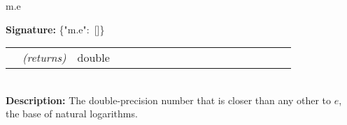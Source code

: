 {{    {m.e}{\hypertarget{m.e}{\noindent \mbox{\hspace{0.015\linewidth}} {\bf Signature:} \mbox{\PFAc \{"m.e":$\!$ []\}  \vspace{0.2 cm} \\} \vspace{0.2 cm} \\ \rm \begin{tabular}{p{0.01\linewidth} l p{0.8\linewidth}} & {\it (returns)} & double \\ \end{tabular} \vspace{0.3 cm} \\ \mbox{\hspace{0.015\linewidth}} {\bf Description:} The double-precision number that is closer than any other to $e$, the base of natural logarithms. \vspace{0.2 cm} \\ }}%
}}
